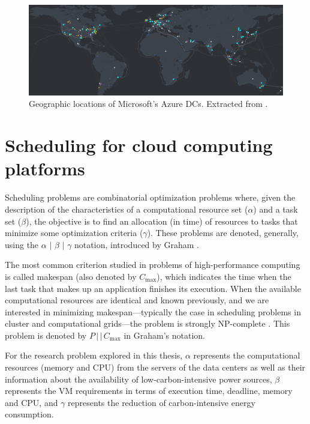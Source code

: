 \begin{figure}[h]
\centering
  \includegraphics[width=\linewidth]{images/azure_cloud_infra.png}
  \caption{Geographic locations of Microsoft's Azure DCs. Extracted from \cite{azure_dcs_location}.}
  \label{fig:dc_locations}
\end{figure}


\section{Scheduling for cloud computing platforms}
\label{sec:scheduling_cloud}

Scheduling problems are combinatorial optimization problems where, given the description of the characteristics of a computational resource set ($\alpha$) and a task set ($\beta$), the objective is to find an allocation (in time) of resources to tasks that minimize some optimization criteria ($\gamma$). These problems are denoted, generally, using the $\alpha$ $\vert$ $\beta$ $\vert$ $\gamma$ notation, introduced by Graham \citep{graham}. 

The most common criterion studied in problems of high-performance computing is called makespan (also denoted by $C_{\max}$), which indicates the time when the last task that makes up an application finishes its execution. When the available computational resources are identical and known previously, and we are interested in minimizing makespan---typically the case in scheduling problems in cluster and computational grids---the problem is strongly NP-complete \citep{Garey}. This problem is denoted by $P\,\vert\,\vert\,C_{\max}$ in Graham's notation.

For the research problem explored in this thesis, $\alpha$ represents the computational resources (memory and CPU) from the servers of the data centers as well as their information about the availability of low-carbon-intensive power sources, $\beta$ represents the VM requirements in terms of execution time,  deadline, memory and CPU, and $\gamma$ represents the reduction of carbon-intensive energy consumption.

